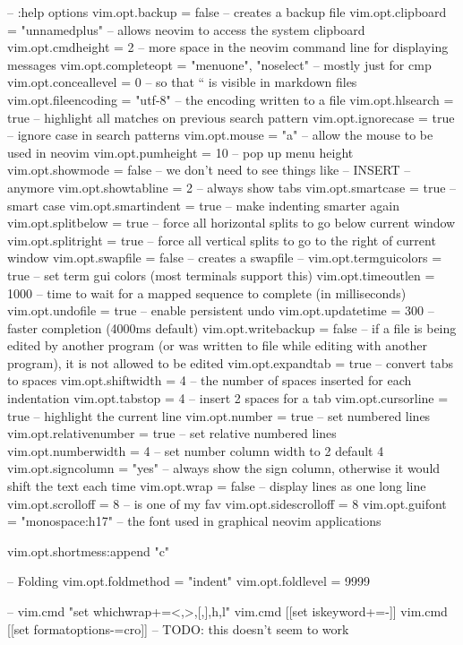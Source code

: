 -- :help options vim.opt.backup = false                          -- creates a backup file
vim.opt.clipboard = "unnamedplus"               -- allows neovim to access the system clipboard
vim.opt.cmdheight = 2                           -- more space in the neovim command line for displaying messages
vim.opt.completeopt = { "menuone", "noselect" } -- mostly just for cmp
vim.opt.conceallevel = 0                        -- so that `` is visible in markdown files
vim.opt.fileencoding = "utf-8"                  -- the encoding written to a file
vim.opt.hlsearch = true                         -- highlight all matches on previous search pattern
vim.opt.ignorecase = true                       -- ignore case in search patterns
vim.opt.mouse = "a"                             -- allow the mouse to be used in neovim
vim.opt.pumheight = 10                          -- pop up menu height
vim.opt.showmode = false                        -- we don't need to see things like -- INSERT -- anymore
vim.opt.showtabline = 2                         -- always show tabs
vim.opt.smartcase = true                        -- smart case
vim.opt.smartindent = true                      -- make indenting smarter again
vim.opt.splitbelow = true                       -- force all horizontal splits to go below current window
vim.opt.splitright = true                       -- force all vertical splits to go to the right of current window
vim.opt.swapfile = false                        -- creates a swapfile
-- vim.opt.termguicolors = true                    -- set term gui colors (most terminals support this)
vim.opt.timeoutlen = 1000                       -- time to wait for a mapped sequence to complete (in milliseconds)
vim.opt.undofile = true                         -- enable persistent undo
vim.opt.updatetime = 300                        -- faster completion (4000ms default)
vim.opt.writebackup = false                     -- if a file is being edited by another program (or was written to file while editing with another program), it is not allowed to be edited
vim.opt.expandtab = true                        -- convert tabs to spaces
vim.opt.shiftwidth = 4                          -- the number of spaces inserted for each indentation
vim.opt.tabstop = 4                             -- insert 2 spaces for a tab
vim.opt.cursorline = true                       -- highlight the current line
vim.opt.number = true                           -- set numbered lines
vim.opt.relativenumber = true                  -- set relative numbered lines
vim.opt.numberwidth = 4                         -- set number column width to 2 {default 4}
vim.opt.signcolumn = "yes"                      -- always show the sign column, otherwise it would shift the text each time
vim.opt.wrap = false                            -- display lines as one long line
vim.opt.scrolloff = 8                           -- is one of my fav
vim.opt.sidescrolloff = 8
vim.opt.guifont = "monospace:h17"               -- the font used in graphical neovim applications

vim.opt.shortmess:append "c"

-- Folding
vim.opt.foldmethod = "indent"
vim.opt.foldlevel = 9999

-- vim.cmd "set whichwrap+=<,>,[,],h,l"
vim.cmd [[set iskeyword+=-]]
vim.cmd [[set formatoptions-=cro]] -- TODO: this doesn't seem to work
